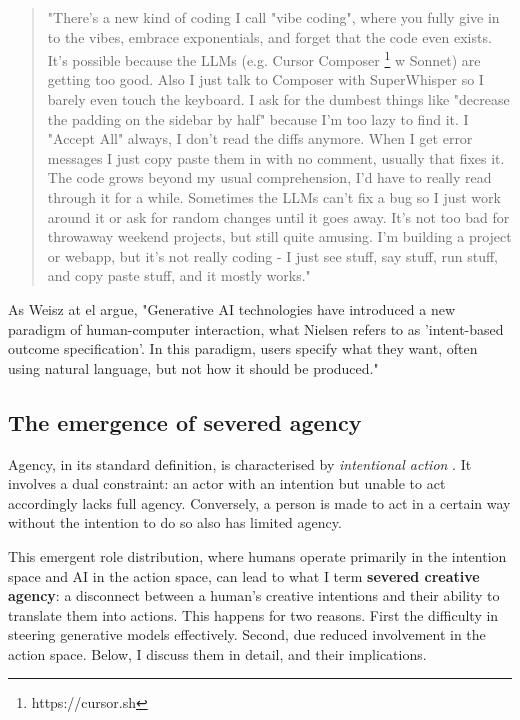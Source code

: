 \begin{quote}
"There's a new kind of coding I call "vibe coding", where you fully give in to the vibes, embrace exponentials, and forget that the code even exists. It's possible because the LLMs (e.g. Cursor Composer \footnote{https://cursor.sh} w Sonnet) are getting too good. Also I just talk to Composer with SuperWhisper so I barely even touch the keyboard. I ask for the dumbest things like "decrease the padding on the sidebar by half" because I'm too lazy to find it. I "Accept All" always, I don't read the diffs anymore. When I get error messages I just copy paste them in with no comment, usually that fixes it. The code grows beyond my usual comprehension, I'd have to really read through it for a while. Sometimes the LLMs can't fix a bug so I just work around it or ask for random changes until it goes away. It's not too bad for throwaway weekend projects, but still quite amusing. I'm building a project or webapp, but it's not really coding - I just see stuff, say stuff, run stuff, and copy paste stuff, and it mostly works." \cite{Karpathy2025-uu}
\end{quote}

As Weisz at el \cite{Weisz2024-io} argue, "Generative AI technologies have introduced a new paradigm of human-computer interaction, what Nielsen refers to as 'intent-based outcome specification'. In this paradigm, users specify what they want, often using natural language, but not how it should be produced."

\subsection{The emergence of severed agency}

Agency, in its standard definition, is characterised by \textit{intentional action} \cite{Schlosser2019-jk}. It involves a dual constraint: an actor with an intention but unable to act accordingly lacks full agency. Conversely, a person is made to act in a certain way without the intention to do so also has limited agency. 

This emergent role distribution, where humans operate primarily in the intention space and AI in the action space, can lead to what I term \textbf{severed creative agency}: a disconnect between a human's creative intentions and their ability to translate them into actions. This happens for two reasons. First the difficulty in steering generative models effectively. Second, due reduced involvement in the action space. Below, I discuss them in detail, and their implications. 


